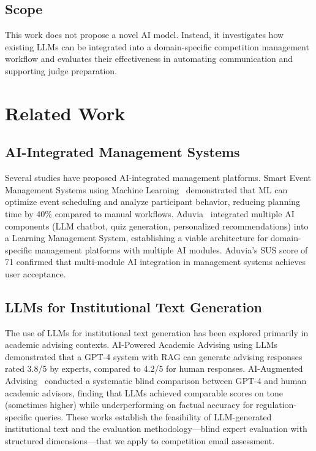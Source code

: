 \documentclass[runningheads]{llncs}
\begin{document}
\subsection{Scope}

This work does not propose a novel AI model. Instead, it investigates how existing LLMs can be integrated into a domain-specific competition management workflow and evaluates their effectiveness in automating communication and supporting judge preparation.

\section{Related Work}

\subsection{AI-Integrated Management Systems}

Several studies have proposed AI-integrated management platforms. Smart Event Management Systems using Machine Learning~\cite{ref_smart_event} demonstrated that ML can optimize event scheduling and analyze participant behavior, reducing planning time by 40\% compared to manual workflows. Aduvia~\cite{ref_aduvia} integrated multiple AI components (LLM chatbot, quiz generation, personalized recommendations) into a Learning Management System, establishing a viable architecture for domain-specific management platforms with multiple AI modules. Aduvia's SUS score of 71 confirmed that multi-module AI integration in management systems achieves user acceptance.

\subsection{LLMs for Institutional Text Generation}

The use of LLMs for institutional text generation has been explored primarily in academic advising contexts. AI-Powered Academic Advising using LLMs~\cite{ref_advising_llm} demonstrated that a GPT-4 system with RAG can generate advising responses rated 3.8/5 by experts, compared to 4.2/5 for human responses. AI-Augmented Advising~\cite{ref_augmented_advising} conducted a systematic blind comparison between GPT-4 and human academic advisors, finding that LLMs achieved comparable scores on tone (sometimes higher) while underperforming on factual accuracy for regulation-specific queries. These works establish the feasibility of LLM-generated institutional text and the evaluation methodology---blind expert evaluation with structured dimensions---that we apply to competition email assessment.
\end{document}
